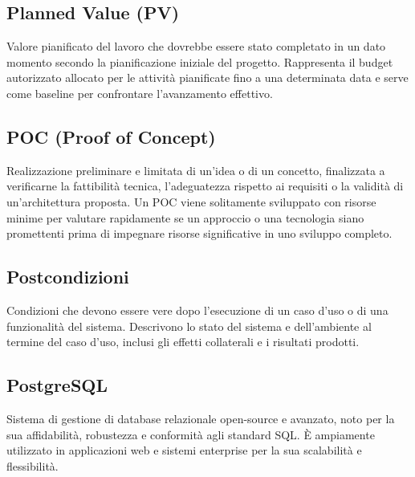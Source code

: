 \documentclass[a4paper,11pt]{article}
\begin{document}
\subsection{Planned Value (PV)}

Valore pianificato del lavoro che dovrebbe essere stato completato in un dato momento secondo la pianificazione iniziale del progetto. Rappresenta il budget autorizzato allocato per le attività pianificate fino a una determinata data e serve come baseline per confrontare l'avanzamento effettivo.







\subsection{POC (Proof of Concept)}
Realizzazione preliminare e limitata di un'idea o di un concetto, finalizzata a verificarne la fattibilità tecnica, l'adeguatezza rispetto ai requisiti o la validità di un'architettura proposta. Un POC viene solitamente sviluppato con risorse minime per valutare rapidamente se un approccio o una tecnologia siano promettenti prima di impegnare risorse significative in uno sviluppo completo.









\subsection{Postcondizioni}
Condizioni che devono essere vere dopo l'esecuzione di un caso d'uso o di una funzionalità del sistema. Descrivono lo stato del sistema e dell'ambiente al termine del caso d'uso, inclusi gli effetti collaterali e i risultati prodotti.








\subsection{PostgreSQL}
Sistema di gestione di database relazionale open-source e avanzato, noto per la sua affidabilità, robustezza e conformità agli standard SQL. È ampiamente utilizzato in applicazioni web e sistemi enterprise per la sua scalabilità e flessibilità.
\end{document}

